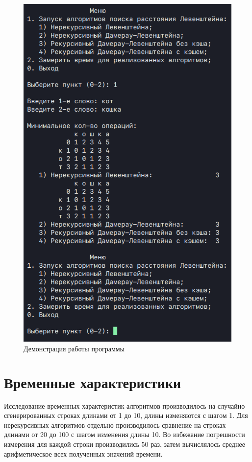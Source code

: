 \clearpage
\begin{figure}[h]
    \centering
    \includegraphics[height=0.7\textheight]{images/prog_demo.png}
    \caption{Демонстрация работы программы}
    \label{fig:prog-demo}
\end{figure}

\section{Временные характеристики}

Исследование временных характеристик алгоритмов производилось на случайно сгенерированных строках длинами от 1 до 10, длины изме\-няются с шагом 1. Для нерекурсивных алгоритмов отдельно производилось сравнение на строках длинами от 20 до 100 с шагом изменения длины 10. Во избежание погрешности измерения для каждой строки производились 50 раз, затем вычислялось среднее арифметическое всех полученных значений времени.

